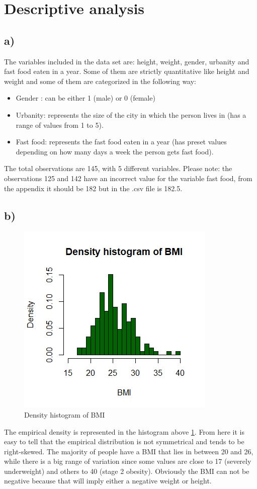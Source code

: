 \section{Descriptive analysis} 

\subsection{a)}
The variables included in the data set are: height, weight, gender, urbanity and fast food eaten in a year. Some of them are strictly quantitative like height and weight and some of them are categorized in the following way:
\begin{itemize}
    \item Gender : can be either 1 (male) or 0 (female)
    \item Urbanity: represents the size of the city in which the person lives in (has a range of values from 1 to 5).
    \item Fast food: represents the fast food eaten in a year (has preset values depending on how many days a week the person gets fast food).
\end{itemize}
The total observations are 145, with 5 different variables. Please note: the observations 125 and 142 have an incorrect value for the variable fast food, from the appendix it should be 182 but in the .csv file is 182.5.

\subsection{b)}
\begin{figure}[h!]
    \centering
    \includegraphics{root/Rplot1.png}
    \caption{Density histogram of BMI}
    \label{DensityHistEveryone}
\end{figure}
The empirical density is represented in the histogram above \ref{DensityHistEveryone}. From here it is easy to tell that the empirical distribution is not symmetrical and tends to be right-skewed. The majority of people have a BMI that lies in between 20 and 26, while there is a big range of variation since some values are close to 17 (severely underweight) and others to 40 (stage 2 obesity). Obviously the BMI can not be negative because that will imply either a negative weight or height. 

